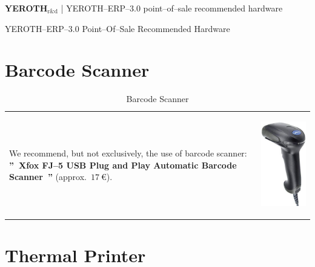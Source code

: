 \documentclass[12pt, a4paper]{article}
\newcommand{\yerothrd}{\textcolor{yerothColorGreen}
			{\textsc{\textcolor{yerothColorRed}{YEROTH}}$_{\text{r\&d}}$\xspace}}
\newcommand{\yerotherpblack}{YEROTH--ERP--$3.0$\xspace}
\newcommand{\money}[1]{$#1\ \euro{}$\xspace}
\begin{document}
{\bf \Large \yerothrd} {| \sc \scriptsize \yerotherpblack point--of--sale recommended hardware}

\vspace{2.5em}


\parbox{27em}{\LARGE \yerotherpblack Point--Of--Sale Recommended Hardware}

\vspace{0.5em}

\section{Barcode Scanner}
\vspace{-3.7em}

\begin{table}[!htbp]
\begin{tabular}{lr}
\parbox{25em}{
We recommend, but not exclusively, the use 
of barcode scanner:
\textbf{''~Xfox FJ--5 USB Plug and Play Automatic
Barcode Scanner~''} (approx.~\money{17}).
\vspace{-3em}
}

&

\parbox{17em}{
\begin{center}
\includegraphics[scale=0.2]{images/xfox-fj-5-usb-plug-and-play-automatic-barcode-scanner.png}
\caption*{Barcode Scanner}
\end{center}
}
\end{tabular}
\end{table}

\vspace{-0.8em}
\section{Thermal Printer}
\vspace{-2.7em}
\end{document}
